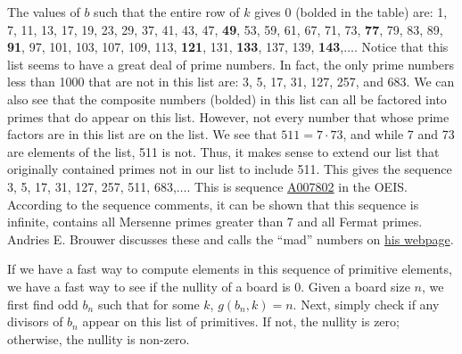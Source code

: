 \documentclass{article}
\begin{document}
	The values of $b$ such that the entire row of $k$ gives 0 (bolded in the table) are:
	1, 7, 11, 13, 17, 19, 23, 29, 37, 41, 43, 47, \textbf{49}, 53, 59, 61, 67, 71, 73, \textbf{77}, 79, 83, 89, \textbf{91}, 97, 101, 103, 107, 109, 113, \textbf{121}, 131, \textbf{133}, 137, 139, \textbf{143},$\dots$.
	Notice that this list seems to have a great deal of prime numbers.
	In fact, the only prime numbers less than 1000 that are not in this list are: 3, 5, 17, 31, 127, 257, and 683.
	We can also see that the composite numbers (bolded) in this list can all be factored into primes that do appear on this list.
	However, not every number that whose prime factors are in this list are on the list.
	We see that $511 = 7 \cdot 73$, and while 7 and 73 are elements of the list, 511 is not.
	Thus, it makes sense to extend our list that originally contained primes not in our list to include 511.
	This gives the sequence 3, 5, 17, 31, 127, 257, 511, 683,$\dots$.
	This is sequence \href{https://oeis.org/A007802}{A007802} in the OEIS.
	According to the sequence comments, it can be shown that this sequence is infinite, contains all Mersenne primes greater than 7 and all Fermat primes.
	Andries E. Brouwer discusses these and calls the ``mad'' numbers on \href{https://www.win.tue.nl/~aeb/ca/madness/madrect.html}{his webpage}.
	
	If we have a fast way to compute elements in this sequence of primitive elements, we have a fast way to see if the nullity of a board is 0.
	Given a board size $n$, we first find odd $b_n$ such that for some $k$, $g(b_n,k)=n$.
	Next, simply check if any divisors of $b_n$ appear on this list of primitives.
	If not, the nullity is zero; otherwise, the nullity is non-zero.
\end{document}
